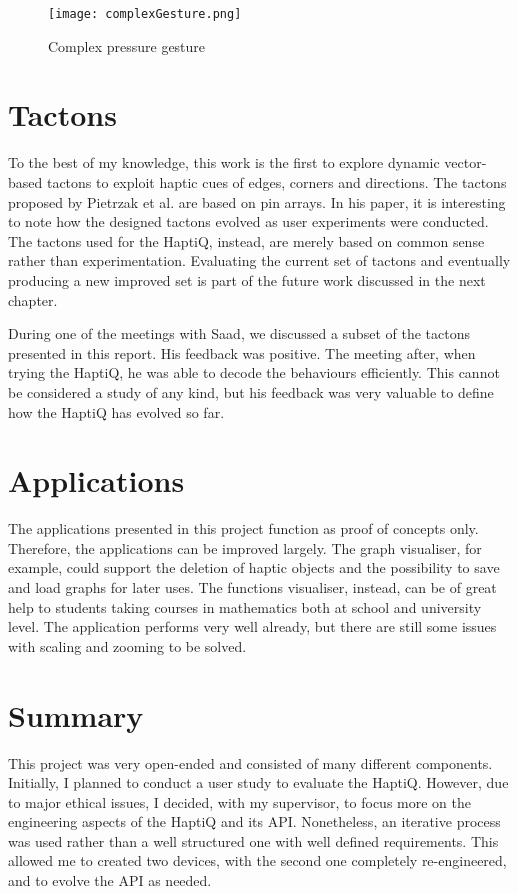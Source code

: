 \begin{figure}[H]
  \centering
  \texttt{[image: complexGesture.png]}
  \caption{Complex pressure gesture}
  \label{fig:complexGesture}
\end{figure}

\section{Tactons}

To the best of my knowledge, this work is the first to explore dynamic vector-based tactons to exploit haptic cues of edges, corners and directions. The tactons proposed by Pietrzak et al. \cite{pietrzak2009creating} are based on pin arrays. In his paper, it is interesting to note how the designed tactons evolved as user experiments were conducted. The tactons used for the HaptiQ, instead, are merely based on common sense rather than experimentation. Evaluating the current set of tactons and eventually producing a new improved set is part of the future work discussed in the next chapter.

During one of the meetings with Saad, we discussed a subset of the tactons presented in this report. His feedback was positive. The meeting after, when trying the HaptiQ, he was able to decode the behaviours efficiently. This cannot be considered a study of any kind, but his feedback was very valuable to define how the HaptiQ has evolved so far. 

\section{Applications}

The applications presented in this project function as proof of concepts only. Therefore, the applications can be improved largely. The graph visualiser, for example, could support the deletion of haptic objects and the possibility to save and load graphs for later uses. The functions visualiser, instead, can be of great help to students taking courses in mathematics both at school and university level. The application performs very well already, but there are still some issues with scaling and zooming to be solved. 

\section{Summary}

This project was very open-ended and consisted of many different components. Initially, I planned to conduct a user study to evaluate the HaptiQ. However, due to major ethical issues, I decided, with my supervisor, to focus more on the engineering aspects of the HaptiQ and its API. Nonetheless, an iterative process was used rather than a well structured one with well defined requirements. This allowed me to created two devices, with the second one completely re-engineered, and to evolve the API as needed.    

